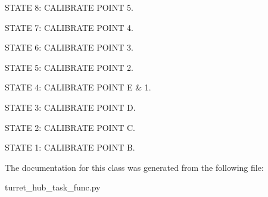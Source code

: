S\+T\+A\+TE 8\+: C\+A\+L\+I\+B\+R\+A\+TE P\+O\+I\+NT 5.

S\+T\+A\+TE 7\+: C\+A\+L\+I\+B\+R\+A\+TE P\+O\+I\+NT 4.

S\+T\+A\+TE 6\+: C\+A\+L\+I\+B\+R\+A\+TE P\+O\+I\+NT 3.

S\+T\+A\+TE 5\+: C\+A\+L\+I\+B\+R\+A\+TE P\+O\+I\+NT 2.

S\+T\+A\+TE 4\+: C\+A\+L\+I\+B\+R\+A\+TE P\+O\+I\+NT E \& 1.

S\+T\+A\+TE 3\+: C\+A\+L\+I\+B\+R\+A\+TE P\+O\+I\+NT D.

S\+T\+A\+TE 2\+: C\+A\+L\+I\+B\+R\+A\+TE P\+O\+I\+NT C.

S\+T\+A\+TE 1\+: C\+A\+L\+I\+B\+R\+A\+TE P\+O\+I\+NT B. 

The documentation for this class was generated from the following file\+:\begin{DoxyCompactItemize}
\item 
turret\+\_\+hub\+\_\+task\+\_\+func.\+py\end{DoxyCompactItemize}
